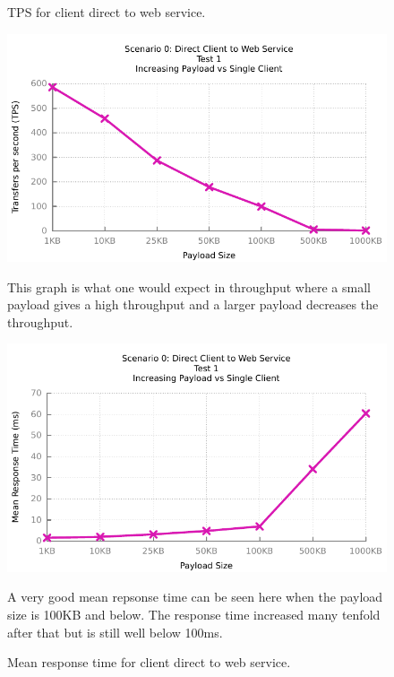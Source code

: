 \begin{figure}[H]
	\caption{TPS for client direct to web service.}
	\centerline{\includegraphics{img/direct_fu_ip_tps}}
	\label{fig:direct-1-1}
	This graph is what one would expect in throughput where a small payload gives a high throughput and a larger payload decreases the throughput.

	\caption{Mean response time for client direct to web service.}
	\centerline{\includegraphics{img/direct_fu_ip_resp}}
	\label{fig:direct-1-2}
	A very good mean repsonse time can be seen here when the payload size is 100KB and below. The response time increased many tenfold after that but is still well below 100ms.
\end{figure}

